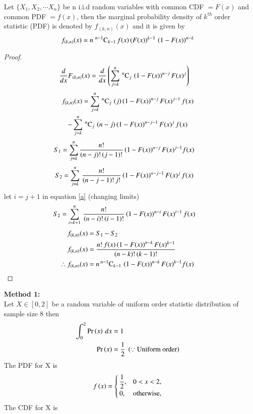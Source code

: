\documentclass[journal,12pt,twocolumn]{IEEEtran}
\begin{document}
\begin{theorem}
Let $\{X_1, X_2, \cdots X_n\}$ be n i.i.d random variables with common CDF $= F(x)$ and common PDF $= f(x)$, 
then the marginal probability density of $k^{th}$ order statistic (PDF) is denoted by $f_{(k,n)}(x)$  and it
is given by
\begin{align}
f_{(k,n)}(x) = n\;{}^{n-1}\mathrm{C}_{k-1}\,f(x)\,(F(x))^{k-1}\,\left(1-F(x)\right)^{n-k} \label{eqn_2}
\end{align}
\label{th2}
\end{theorem}
\begin{proof}
\begin{align}
\dfrac{d}{dx} F_{(k,n)}(x) &= \dfrac{d}{dx}\left(\sum_{j=k}^{n}\,{}^{n}\mathrm{C}_{j}\,\left(1-F(x)\right)^{n-j} F(x)^{j}\right) 
 \end{align}
\begin{multline}
f_{(k,n)}(x) = \sum_{j=k}^{n}\,{}^{n}\mathrm{C}_{j}\,\left(j\right)\left(1-F(x)\right)^{n-j}F(x)^{j-1}\,f(x)  \\
                -\sum_{j=k}^{n}\,{}^{n}\mathrm{C}_{j}\,\left(n-j\right)\left(1-F(x)\right)^{n-j-1}F(x)^{j}\,f(x) 
\end{multline}
\begin{align}
S_1  &= \sum_{j=k}^{n} \dfrac{n!}{(n-j)!\,(j-1)!}\left(1-F(x)\right)^{n-j}F(x)^{j-1} f(x) 
\end{align}
\begin{align}
S_2  &= \sum_{j=k}^{n}\,\dfrac{n!}{(n-j-1)!\,j!}\left(1-F(x)\right)^{n-j-1}F(x)^{j}\,f(x) \label{a}
\end{align}
let $i = j+1$ in equation \eqref{a} (changing limits)
\begin{align}
S_2  &= \sum_{i=k+1}^{n}\,\dfrac{n!}{(n-i)!\,(i-1)!}\left(1-F(x)\right)^{n-i}F(x)^{i-1}\,f(x) 
\end{align}
\begin{align}
f_{(k,n)}(x) &= S_1 - S_2 \\
f_{(k,n)}(x) &= \dfrac{n!\,f(x)\left(1-F(x)\right)^{n-k}F(x)^{k-1}}{(n-k)!\,(k-1)!}\\
\therefore f_{(k,n)}(x) &= n\,{}^{n-1}\mathrm{C}_{k-1}\,\left(1-F(x)\right)^{n-k}F(x)^{k-1} f(x)
\end{align}
\end{proof}
\textbf{Method 1:} \\
Let $X\in[0,2]$ be a random variable of uniform order statistic distribution of sample size 8 then
\begin{align}
 \int_{0}^{2} \Pr\left(x\right)\,dx &= 1 \\
 \Pr\left(x\right)                  &= \dfrac{1}{2}\;\left(\because \text{Uniform order}\right)
\end{align}
The PDF for X is 
\begin{align}
f\left(x\right) = 
 \begin{cases}
  \dfrac{1}{2},      &0<x<2, \\ 
     0, &\text{otherwise,}
 \end{cases} \label{d}
\end{align}
 The CDF for X is 
 
\end{document}
